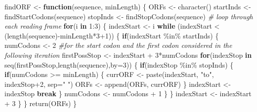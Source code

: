 \documentclass[
]{article}
\newenvironment{Shaded}{\begin{snugshade}}{\end{snugshade}}
\newcommand{\AttributeTok}[1]{\textcolor[rgb]{0.77,0.63,0.00}{#1}}
\newcommand{\CommentTok}[1]{\textcolor[rgb]{0.56,0.35,0.01}{\textit{#1}}}
\newcommand{\ControlFlowTok}[1]{\textcolor[rgb]{0.13,0.29,0.53}{\textbf{#1}}}
\newcommand{\DecValTok}[1]{\textcolor[rgb]{0.00,0.00,0.81}{#1}}
\newcommand{\FunctionTok}[1]{\textcolor[rgb]{0.00,0.00,0.00}{#1}}
\newcommand{\NormalTok}[1]{#1}
\newcommand{\OtherTok}[1]{\textcolor[rgb]{0.56,0.35,0.01}{#1}}
\newcommand{\SpecialCharTok}[1]{\textcolor[rgb]{0.00,0.00,0.00}{#1}}
\newcommand{\StringTok}[1]{\textcolor[rgb]{0.31,0.60,0.02}{#1}}
\begin{document}
\begin{Shaded}
\begin{Highlighting}[]
\NormalTok{findORF }\OtherTok{\textless{}{-}} \ControlFlowTok{function}\NormalTok{(sequence, minLength) \{}
\NormalTok{    ORFs }\OtherTok{\textless{}{-}} \FunctionTok{character}\NormalTok{()}
\NormalTok{    startInds }\OtherTok{\textless{}{-}} \FunctionTok{findStartCodons}\NormalTok{(sequence)}
\NormalTok{    stopInds }\OtherTok{\textless{}{-}} \FunctionTok{findStopCodons}\NormalTok{(sequence)}
    \CommentTok{\# loop through each reading frame}
    \ControlFlowTok{for}\NormalTok{(i }\ControlFlowTok{in} \DecValTok{1}\SpecialCharTok{:}\DecValTok{3}\NormalTok{) \{}
\NormalTok{        indexStart }\OtherTok{\textless{}{-}}\NormalTok{ i}
        \ControlFlowTok{while}\NormalTok{ (indexStart }\SpecialCharTok{\textless{}}\NormalTok{ (}\FunctionTok{length}\NormalTok{(sequence)}\SpecialCharTok{{-}}\NormalTok{minLength}\SpecialCharTok{*}\DecValTok{3}\SpecialCharTok{+}\DecValTok{1}\NormalTok{)) \{}
            \ControlFlowTok{if}\NormalTok{(indexStart }\SpecialCharTok{\%in\%}\NormalTok{ startInds) \{}
\NormalTok{                numCodons }\OtherTok{\textless{}{-}} \DecValTok{2} \CommentTok{\#for the start codon and the first codon considered in the following iteration}
\NormalTok{                firstPossStop }\OtherTok{\textless{}{-}}\NormalTok{ indexStart }\SpecialCharTok{+} \DecValTok{3}\SpecialCharTok{*}\NormalTok{numCodons}
                \ControlFlowTok{for}\NormalTok{(indexStop }\ControlFlowTok{in} \FunctionTok{seq}\NormalTok{(firstPossStop,}\FunctionTok{length}\NormalTok{(sequence),}\AttributeTok{by=}\DecValTok{3}\NormalTok{)) \{}
                    \ControlFlowTok{if}\NormalTok{(indexStop }\SpecialCharTok{\%in\%}\NormalTok{ stopInds) \{}
                        \ControlFlowTok{if}\NormalTok{(numCodons }\SpecialCharTok{\textgreater{}=}\NormalTok{ minLength) \{}
\NormalTok{                            currORF }\OtherTok{\textless{}{-}} \FunctionTok{paste}\NormalTok{(indexStart, }\StringTok{"to"}\NormalTok{, indexStop}\SpecialCharTok{+}\DecValTok{2}\NormalTok{, }\AttributeTok{sep=}\StringTok{" "}\NormalTok{)}
\NormalTok{                            ORFs }\OtherTok{\textless{}{-}} \FunctionTok{append}\NormalTok{(ORFs, currORF)}
\NormalTok{                        \}}
\NormalTok{                        indexStart }\OtherTok{\textless{}{-}}\NormalTok{ indexStop}
                        \ControlFlowTok{break}
\NormalTok{                    \}}
\NormalTok{                    numCodons }\OtherTok{\textless{}{-}}\NormalTok{ numCodons }\SpecialCharTok{+} \DecValTok{1}
\NormalTok{                \}}
\NormalTok{            \}}
\NormalTok{            indexStart }\OtherTok{\textless{}{-}}\NormalTok{ indexStart }\SpecialCharTok{+} \DecValTok{3}
\NormalTok{        \}}
\NormalTok{    \}}
    \FunctionTok{return}\NormalTok{(ORFs)}
\NormalTok{\}}
\end{Highlighting}
\end{Shaded}
\end{document}
